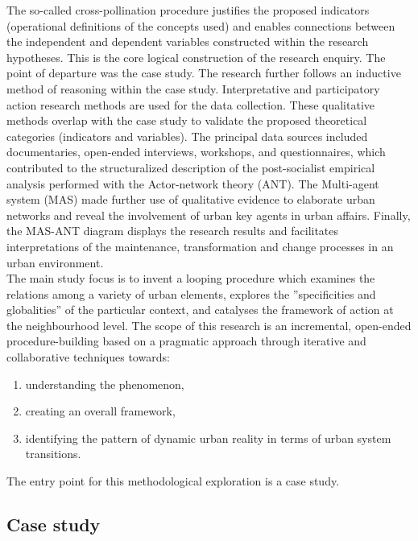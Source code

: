 \documentclass[11pt]{report}
\begin{document}
The so-called cross-pollination procedure justifies the proposed indicators (operational definitions of the concepts used) and enables connections between the independent and dependent variables constructed within the research hypotheses. This is the core logical construction of the research enquiry. The point of departure was the case study. The research further follows an inductive method of reasoning within the case study. Interpretative and participatory action research methods are used for the data collection. These qualitative methods overlap with the case study to validate the proposed theoretical categories (indicators and variables). The principal data sources included documentaries, open-ended interviews, workshops, and questionnaires, which contributed to the structuralized description of the post-socialist empirical analysis performed with the Actor-network theory (ANT). The Multi-agent system (MAS) made further use of qualitative evidence to elaborate urban networks and reveal the involvement of urban key agents in urban affairs. Finally, the MAS-ANT diagram displays the research results and facilitates interpretations of the maintenance, transformation and change processes in an urban environment.
\\

The main study focus is to invent a looping procedure which examines the relations among a variety of urban elements, explores the ”specificities and globalities” of the particular context, and catalyses the framework of action at the neighbourhood level.  The scope of this research is an incremental, open-ended procedure-building based on a pragmatic approach through iterative and collaborative techniques towards:

\begin{enumerate}
\item understanding the phenomenon,
\item creating an overall framework,
\item identifying the pattern of dynamic urban reality in terms of urban system transitions. 
\end{enumerate} 

The entry point for this methodological exploration is a case study.

\subsection{Case study}
\end{document}
